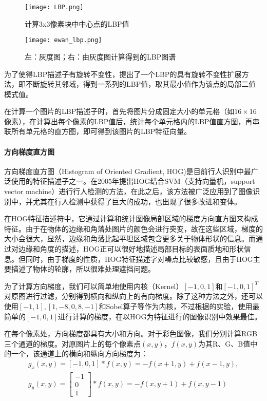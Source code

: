 \begin{figure}[htb]
  \centering
  \texttt{[image: LBP.png]}
  \caption{计算3x3像素块中中心点的LBP值}
  \label{fig:lbp_procedure}
\end{figure}

\begin{figure}[htb]
  \centering
  \texttt{[image: ewan\_lbp.png]}
  \caption{左：灰度图；右：由灰度图计算得到的LBP图谱}
  \label{fig:lbp}
\end{figure}

  为了使得LBP描述子有旋转不变性，\citet{ojala2002multiresolution}提出了一个LBP的具有旋转不变性扩展方法，即不断旋转其邻域，得到一系列的LBP值，取其最小值作为该点的局部二值模式值。

  在计算一个图片的LBP描述子时，首先将图片分成固定大小的单元格（如$16\times16$像素），在计算出每个像素的LBP值后，统计每个单元格内的LBP值直方图，再串联所有单元格的直方图，即可得到该图片的LBP特征向量。

\paragraph{方向梯度直方图}

  方向梯度直方图（Histogram of Oriented Gradient, HOG)是目前行人识别中最广泛使用的特征描述子之一。\citet{dalal2005histograms}在2005年提出HOG结合SVM（支持向量机，support vector machine）进行行人检测的方法，在此之后，该方法被广泛应用到了图像识别中，并尤其在行人检测中获得了巨大的成功，也出现了很多改进和变体。

  在HOG特征描述符中，它通过计算和统计图像局部区域的梯度方向直方图来构成特征。由于在物体的边缘和角落处图片的颜色会进行突变，故在这些区域，梯度的大小会很大，显然，边缘和角落比起平坦区域包含更多关于物体形状的信息。而通过对边缘和角度的描述，HOG正可以很好地描述局部目标的表面质地和形状信息。但同时，由于梯度的性质，HOG特征描述字对噪点比较敏感，且由于HOG主要描述了物体的轮廓，所以很难处理遮挡问题。

  为了计算方向梯度，我们可以简单地使用内核（Kernel）$[-1,0,1]$和$[-1,0,1]^{T}$对原图进行过滤，分别得到横向和纵向上的有向梯度。除了这种方法之外，还可以使用$[-1,1],[1,-8,0,8,-1]$和Sobel算子等作为内核，不过根据\citet{dalal2005histograms}的实验，使用最简单的$[-1,0,1]$进行计算的梯度，在以HOG为特征进行的图像识别中效果最佳。

  在每个像素处，方向梯度都具有大小和方向。对于彩色图像，我们分别计算RGB三个通道的梯度。对原图片上的每个像素点$(x,y)$，$f(x,y)$为其R、G、B值中的一个，该通道上的横向和纵向方向梯度为：
\begin{gather*}
g_x(x,y)=[-1,0,1]\ast f(x,y)=-f(x+1,y)+f(x-1,y),\\
g_y(x,y)=\begin{bmatrix}
-1 \\
0 \\
1
\end{bmatrix}
\ast f(x,y) = -f(x,y+1)+f(x,y-1)
\end{gather*}

